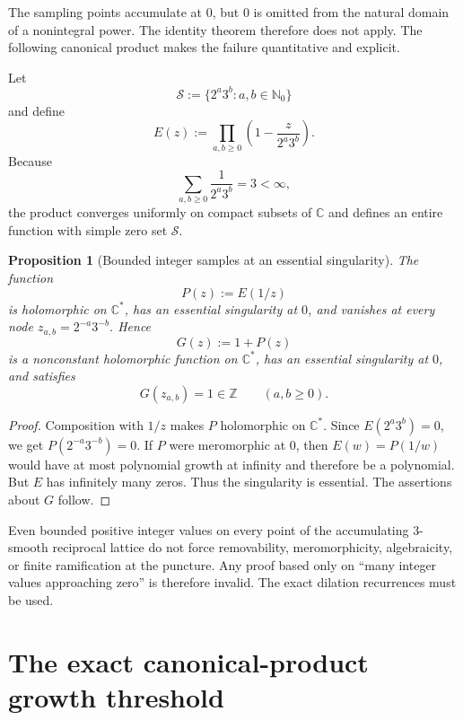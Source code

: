 \documentclass[11pt,oneside]{article}
\newtheorem{proposition}[theorem]{Proposition}
\theoremstyle{definition}
\theoremstyle{remark}
\newcommand{\Nzero}{\mathbb N_0}
\newcommand{\Z}{\mathbb Z}
\newcommand{\C}{\mathbb C}
\begin{document}
The sampling points accumulate at \(0\), but \(0\) is omitted from the natural domain of a nonintegral power.  The identity theorem therefore does not apply.  The following canonical product makes the failure quantitative and explicit.

Let
\begin{equation}
  \mathcal S:=\{2^a3^b:a,b\in\Nzero\}
  \label{eq:S}
\end{equation}
and define
\begin{equation}
  E(z):=\prod_{a,b\ge0}
  \left(1-\frac{z}{2^a3^b}\right).
  \label{eq:canonical-product}
\end{equation}
Because
\[
  \sum_{a,b\ge0}\frac1{2^a3^b}=3<\infty,
\]
the product converges uniformly on compact subsets of \(\C\) and defines an entire function with simple zero set \(\mathcal S\).

\begin{proposition}[Bounded integer samples at an essential singularity]
\label{prop:puncture-nonunique}
The function
\[
  P(z):=E(1/z)
\]
is holomorphic on \(\C^*\), has an essential singularity at \(0\), and vanishes at every node \(z_{a,b}=2^{-a}3^{-b}\).  Hence
\[
  G(z):=1+P(z)
\]
is a nonconstant holomorphic function on \(\C^*\), has an essential singularity at \(0\), and satisfies
\[
  G(z_{a,b})=1\in\Z
  \qquad(a,b\ge0).
\]
\end{proposition}

\begin{proof}
Composition with \(1/z\) makes \(P\) holomorphic on \(\C^*\).  Since \(E(2^a3^b)=0\), we get \(P(2^{-a}3^{-b})=0\).  If \(P\) were meromorphic at \(0\), then \(E(w)=P(1/w)\) would have at most polynomial growth at infinity and therefore be a polynomial.  But \(E\) has infinitely many zeros.  Thus the singularity is essential.  The assertions about \(G\) follow.
\end{proof}

\begin{auditbox}
Even bounded positive integer values on every point of the accumulating \(3\)-smooth reciprocal lattice do not force removability, meromorphicity, algebraicity, or finite ramification at the puncture.  Any proof based only on ``many integer values approaching zero'' is therefore invalid.  The exact dilation recurrences must be used.
\end{auditbox}

\section{The exact canonical-product growth threshold}
\end{document}
